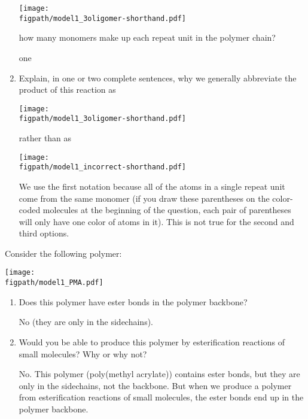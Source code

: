 \begin{activity}
\begin{ctqs}
\begin{enumerate}
	\centerline{\texttt{[image: \\figpath/model1\_3oligomer-shorthand.pdf]}}
	\vspace{-3pt}
	how many monomers make up each repeat unit in the polymer chain?
			
				\begin{solution}[1in]
					one
				\end{solution}
		
			\item Explain, in one or two complete sentences, why we generally abbreviate the product of this reaction as
	
	\centerline{\texttt{[image: \\figpath/model1\_3oligomer-shorthand.pdf]}}
	
	rather than as
	
	\centerline{\texttt{[image: \\figpath/model1\_incorrect-shorthand.pdf]}}
			
				\begin{solution}[2in]
					We use the first notation because all of the atoms in a single repeat unit come from the same monomer (if you draw these parentheses on the color-coded molecules at the beginning of the question, each pair of parentheses will only have one color of atoms in it).  This is not true for the second and third options.
				\end{solution}
			
		\end{enumerate}
	
	\question Consider the following polymer:
	
	\centerline{\texttt{[image: \\figpath/model1\_PMA.pdf]}}
	
		\begin{enumerate}
				
			\item Does this polymer have ester bonds in the polymer backbone?
			
				\begin{solution}[0.75in]
					No (they are only in the sidechains).
				\end{solution}
		
			\item Would you be able to produce this polymer by esterification reactions of small molecules?  Why or why not?
			
				\begin{solution}[2in]
					No.  This polymer (poly(methyl acrylate)) contains ester bonds, but they are only in the sidechains, not the backbone.  But when we produce a polymer from esterification reactions of small molecules, the ester bonds end up in the polymer backbone.
					

\end{solution}
\end{enumerate}
\end{ctqs}
\end{activity}
